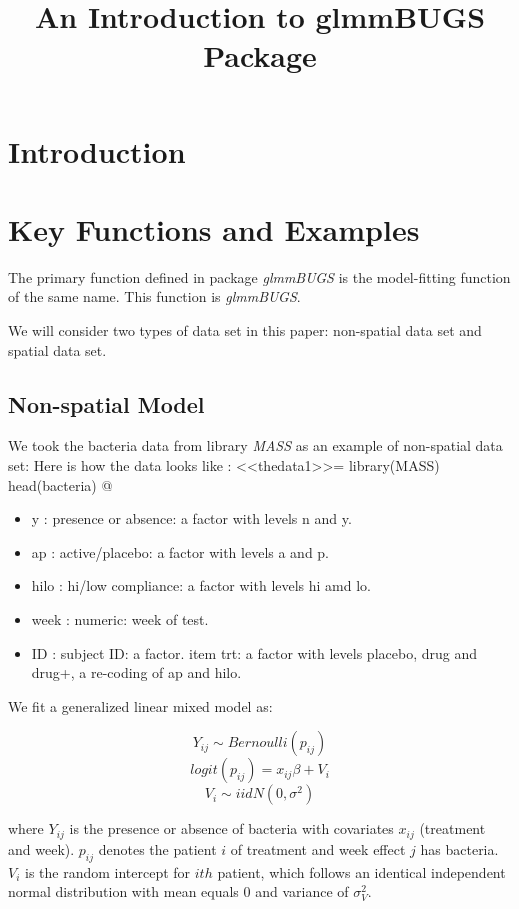 \documentclass{article}
\title{An Introduction to glmmBUGS Package}
\begin{document}
\maketitle

\large
\section{Introduction}
 


\section{Key Functions and Examples}
The primary function defined in package \textit{glmmBUGS} is the model-fitting function of the same name.
This function is \textit{glmmBUGS}. 

We will consider two types of data set in this paper: non-spatial data set and spatial data set.

\subsection{Non-spatial Model} 
We took the bacteria data from library \textit{MASS} as an example of non-spatial data set: 
Here is how the data looks like : 
<<thedata1>>=
library(MASS)
head(bacteria)
@

\begin{itemize}
\item y : presence or absence: a factor with levels n and y. 
\item ap : active/placebo: a factor with levels a and p. 
\item hilo : hi/low compliance: a factor with levels hi amd lo. 
\item week : numeric: week of test. 
\item ID : subject ID: a factor. 
item trt: a factor with levels placebo, drug and drug+, a re-coding of ap and hilo. 
\end{itemize} 

We fit a generalized linear mixed model as: 

\[Y_{ij} \sim  Bernoulli(p_{ij})\]
\[logit(p_{ij}) = x_{ij}\beta + V_{i}\]
\[V_{i} \sim iid N(0, \sigma^2)\] 

where $Y_{ij}$ is the presence or absence of bacteria with covariates $x_{ij}$ (treatment and week).  
$p_{ij}$ denotes the patient $i$ of treatment and week effect $j$ has bacteria.
$V_i$ is the random intercept for $ith$ patient, which follows an identical independent normal distribution with mean equals 0 and variance of $\sigma_V^2$.
\end{document}

